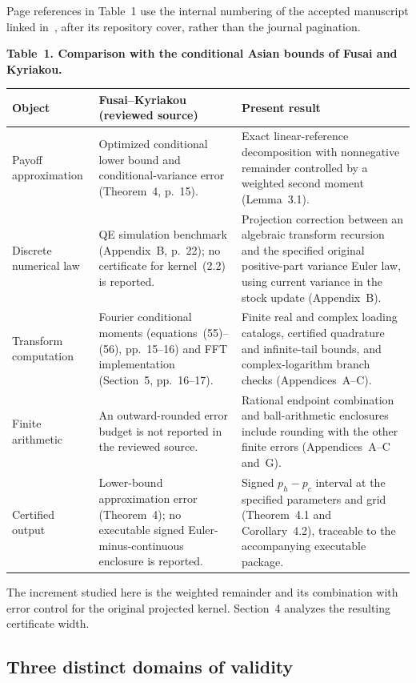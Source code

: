 Page references in Table~1 use the internal numbering of the accepted manuscript linked in~\cite{FusaiKyriakou2016}, after its repository cover, rather than the journal pagination.

\noindent\textbf{Table~1. Comparison with the conditional Asian bounds of Fusai and Kyriakou.}
\begin{tabularx}{\textwidth}{@{}p{}XX@{}}
\toprule
Object & Fusai--Kyriakou (reviewed source) & Present result \\
\midrule
Payoff approximation &
Optimized conditional lower bound and conditional-variance error
(Theorem~4, p.~15). &
Exact linear-reference decomposition with nonnegative remainder
controlled by a weighted second moment
(Lemma~3.1). \\
\addlinespace
Discrete numerical law &
QE simulation benchmark (Appendix~B, p.~22); no certificate for
kernel~(2.2) is reported. &
Projection correction between an algebraic transform recursion and the
specified original positive-part variance Euler law, using current
variance in the stock update (Appendix~B). \\
\addlinespace
Transform computation &
Fourier conditional moments (equations~(55)--(56), pp.~15--16) and FFT
implementation (Section~5, pp.~16--17). &
Finite real and complex loading catalogs, certified quadrature and
infinite-tail bounds, and complex-logarithm branch checks
(Appendices~A--C). \\
\addlinespace
Finite arithmetic &
An outward-rounded error budget is not reported in the reviewed source. &
Rational endpoint combination and ball-arithmetic enclosures include
rounding with the other finite errors (Appendices~A--C and~G). \\
\addlinespace
Certified output &
Lower-bound approximation error (Theorem~4); no executable signed
Euler-minus-continuous enclosure is reported. &
Signed \(p_h-p_c\) interval at the specified parameters and grid
(Theorem~4.1 and Corollary~4.2), traceable to the accompanying executable
package. \\
\bottomrule
\end{tabularx}


The increment studied here is the weighted remainder and its combination with
error control for the original projected kernel. Section~4 analyzes the resulting
certificate width.

\subsection{Three distinct domains of validity}

